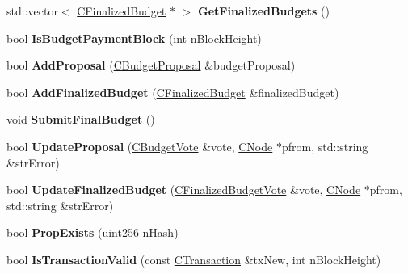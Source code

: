 \begin{DoxyCompactItemize}
std\+::vector$<$ \mbox{\hyperlink{class_c_finalized_budget}{C\+Finalized\+Budget}} $\ast$ $>$ {\bfseries Get\+Finalized\+Budgets} ()
\item 
\mbox{\label{class_c_budget_manager_a1011c9399df614e09f77d87ebe4f7bca}} 
bool {\bfseries Is\+Budget\+Payment\+Block} (int n\+Block\+Height)
\item 
\mbox{\label{class_c_budget_manager_a0338c710edb15b7c1b0818a98d085ead}} 
bool {\bfseries Add\+Proposal} (\mbox{\hyperlink{class_c_budget_proposal}{C\+Budget\+Proposal}} \&budget\+Proposal)
\item 
\mbox{\label{class_c_budget_manager_a3639ad9a2b26e5d7611f55bbb79723d7}} 
bool {\bfseries Add\+Finalized\+Budget} (\mbox{\hyperlink{class_c_finalized_budget}{C\+Finalized\+Budget}} \&finalized\+Budget)
\item 
\mbox{\label{class_c_budget_manager_af60a5c7536d47606f0efdd475e5d171a}} 
void {\bfseries Submit\+Final\+Budget} ()
\item 
\mbox{\label{class_c_budget_manager_a643d564d0232ed6f9e6ca025b8377c13}} 
bool {\bfseries Update\+Proposal} (\mbox{\hyperlink{class_c_budget_vote}{C\+Budget\+Vote}} \&vote, \mbox{\hyperlink{class_c_node}{C\+Node}} $\ast$pfrom, std\+::string \&str\+Error)
\item 
\mbox{\label{class_c_budget_manager_a4ac3207b673d7163a7d03005e35d6f8b}} 
bool {\bfseries Update\+Finalized\+Budget} (\mbox{\hyperlink{class_c_finalized_budget_vote}{C\+Finalized\+Budget\+Vote}} \&vote, \mbox{\hyperlink{class_c_node}{C\+Node}} $\ast$pfrom, std\+::string \&str\+Error)
\item 
\mbox{\label{class_c_budget_manager_a39e5edc6f243614e71167b4380de30d3}} 
bool {\bfseries Prop\+Exists} (\mbox{\hyperlink{classuint256}{uint256}} n\+Hash)
\item 
\mbox{\label{class_c_budget_manager_a1ad65c9d6a743371c0033abf623a291f}} 
bool {\bfseries Is\+Transaction\+Valid} (const \mbox{\hyperlink{class_c_transaction}{C\+Transaction}} \&tx\+New, int n\+Block\+Height)

\end{DoxyCompactItemize}
